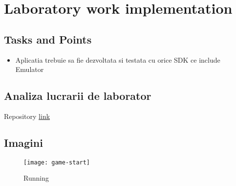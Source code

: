 \section{Laboratory work implementation}

\subsection{Tasks and Points}

\begin{itemize}
	\item Aplicatia trebuie sa fie dezvoltata si testata cu orice SDK ce include Emulator
\end{itemize}

\subsection{Analiza lucrarii de laborator}
Repository \href{https://github.com/AScripnic/MIDPS-laboratories/tree/master/Lab%234}{link}


\subsection{Imagini}
\begin{center}
	\begin{figure}[h]
		\centering
		\texttt{[image: game-start]}\\
		\caption{Running}
		\label{run}
	\end{figure}
\end{center}

\clearpage
